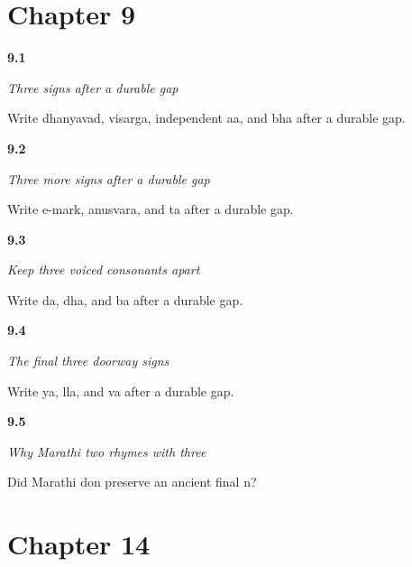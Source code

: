 \section*{Chapter 9}

\noindent\begin{minipage}[t]{\linewidth}
\raggedright
\hypertarget{review-MR-R09-script-a-r3-check}{\textbf{9.1}} \emph{Three signs after a durable gap}\par
\small Write dhanyavad, visarga, independent aa, and bha after a durable gap.
\end{minipage}\par\medskip

\noindent\begin{minipage}[t]{\linewidth}
\raggedright
\hypertarget{review-MR-R09-script-b-r3-check}{\textbf{9.2}} \emph{Three more signs after a durable gap}\par
\small Write e-mark, anusvara, and ta after a durable gap.
\end{minipage}\par\medskip

\noindent\begin{minipage}[t]{\linewidth}
\raggedright
\hypertarget{review-MR-R09-script-c-r3-check}{\textbf{9.3}} \emph{Keep three voiced consonants apart}\par
\small Write da, dha, and ba after a durable gap.
\end{minipage}\par\medskip

\noindent\begin{minipage}[t]{\linewidth}
\raggedright
\hypertarget{review-MR-R09-script-d-r3-check}{\textbf{9.4}} \emph{The final three doorway signs}\par
\small Write ya, lla, and va after a durable gap.
\end{minipage}\par\medskip

\noindent\begin{minipage}[t]{\linewidth}
\raggedright
\hypertarget{review-MR-C06-number-differences-don-ending}{\textbf{9.5}} \emph{Why Marathi \emph{two} rhymes with \emph{three}}\par
\small Did Marathi don preserve an ancient final n?
\end{minipage}\par\medskip

\section*{Chapter 14}

